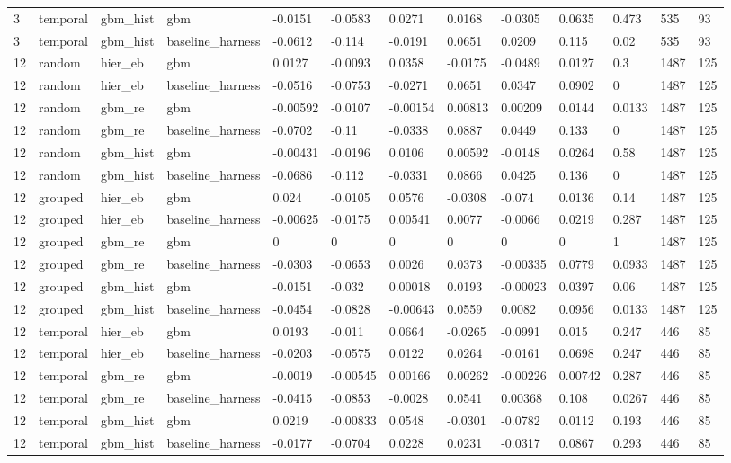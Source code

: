 \begin{tabular}{lllllllllllll}
3 & temporal & gbm\_hist & gbm & -0.0151 & -0.0583 & 0.0271 & 0.0168 & -0.0305 & 0.0635 & 0.473 & 535 & 93 \\
3 & temporal & gbm\_hist & baseline\_harness & -0.0612 & -0.114 & -0.0191 & 0.0651 & 0.0209 & 0.115 & 0.02 & 535 & 93 \\
12 & random & hier\_eb & gbm & 0.0127 & -0.0093 & 0.0358 & -0.0175 & -0.0489 & 0.0127 & 0.3 & 1487 & 125 \\
12 & random & hier\_eb & baseline\_harness & -0.0516 & -0.0753 & -0.0271 & 0.0651 & 0.0347 & 0.0902 & 0 & 1487 & 125 \\
12 & random & gbm\_re & gbm & -0.00592 & -0.0107 & -0.00154 & 0.00813 & 0.00209 & 0.0144 & 0.0133 & 1487 & 125 \\
12 & random & gbm\_re & baseline\_harness & -0.0702 & -0.11 & -0.0338 & 0.0887 & 0.0449 & 0.133 & 0 & 1487 & 125 \\
12 & random & gbm\_hist & gbm & -0.00431 & -0.0196 & 0.0106 & 0.00592 & -0.0148 & 0.0264 & 0.58 & 1487 & 125 \\
12 & random & gbm\_hist & baseline\_harness & -0.0686 & -0.112 & -0.0331 & 0.0866 & 0.0425 & 0.136 & 0 & 1487 & 125 \\
12 & grouped & hier\_eb & gbm & 0.024 & -0.0105 & 0.0576 & -0.0308 & -0.074 & 0.0136 & 0.14 & 1487 & 125 \\
12 & grouped & hier\_eb & baseline\_harness & -0.00625 & -0.0175 & 0.00541 & 0.0077 & -0.0066 & 0.0219 & 0.287 & 1487 & 125 \\
12 & grouped & gbm\_re & gbm & 0 & 0 & 0 & 0 & 0 & 0 & 1 & 1487 & 125 \\
12 & grouped & gbm\_re & baseline\_harness & -0.0303 & -0.0653 & 0.0026 & 0.0373 & -0.00335 & 0.0779 & 0.0933 & 1487 & 125 \\
12 & grouped & gbm\_hist & gbm & -0.0151 & -0.032 & 0.00018 & 0.0193 & -0.00023 & 0.0397 & 0.06 & 1487 & 125 \\
12 & grouped & gbm\_hist & baseline\_harness & -0.0454 & -0.0828 & -0.00643 & 0.0559 & 0.0082 & 0.0956 & 0.0133 & 1487 & 125 \\
12 & temporal & hier\_eb & gbm & 0.0193 & -0.011 & 0.0664 & -0.0265 & -0.0991 & 0.015 & 0.247 & 446 & 85 \\
12 & temporal & hier\_eb & baseline\_harness & -0.0203 & -0.0575 & 0.0122 & 0.0264 & -0.0161 & 0.0698 & 0.247 & 446 & 85 \\
12 & temporal & gbm\_re & gbm & -0.0019 & -0.00545 & 0.00166 & 0.00262 & -0.00226 & 0.00742 & 0.287 & 446 & 85 \\
12 & temporal & gbm\_re & baseline\_harness & -0.0415 & -0.0853 & -0.0028 & 0.0541 & 0.00368 & 0.108 & 0.0267 & 446 & 85 \\
12 & temporal & gbm\_hist & gbm & 0.0219 & -0.00833 & 0.0548 & -0.0301 & -0.0782 & 0.0112 & 0.193 & 446 & 85 \\
12 & temporal & gbm\_hist & baseline\_harness & -0.0177 & -0.0704 & 0.0228 & 0.0231 & -0.0317 & 0.0867 & 0.293 & 446 & 85 \\
\bottomrule
\end{tabular}